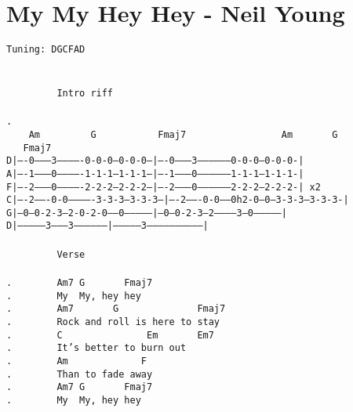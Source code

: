\newpage
\section{My My Hey Hey - Neil Young}
\label{My My Hey Hey - Neil Young}
\texttt{Tuning:\ DGCFAD\\
\\
\\
\ \ \ \ \ \ \ \ \lbrack\ Intro\ riff\rbrack\\
\\
. \ \ \ \ Am\ \ \ \ \ \ \ \ \ G\ \ \ \ \ \ \ \ \ \ \ Fmaj7\ \ \ \ \ \ \ \ \ \ \ \ \ \ \ \ \ Am\ \ \ \ \ \ \ G\ \ \ \ \ \ \ \ \ \ \ \ \ \ Fmaj7\\
D|----0---------3-------------0-0-0--0-0-0--|----0---------3-----------------0-0-0--0-0-0-|\\
A|----1---------0-------------1-1-1--1-1-1--|----1---------0-----------------1-1-1--1-1-1-|\\
F|----2---------0-------------2-2-2--2-2-2--|----2---------0-----------------2-2-2--2-2-2-|\ x2\\
C|----2-------0-0-------------3-3-3--3-3-3--|----2-------0-0-----0h2-0---0---3-3-3--3-3-3-|\\
G|--0---0-2-3---2-0-2-0-----0---------------|--0---0-2-3---2-----------3---0--------------|\\
D|--------------3---------3-----------------|--------------3------------------------------|\\
\\
\ \ \ \ \ \ \ \ \lbrack\ Verse\rbrack\\
\\
. \ \ \ \ \ \ \ Am7\ G\ \ \ \ \ \ \ Fmaj7\\
. \ \ \ \ \ \ \ My\ \ My,\ hey\ hey\\
. \ \ \ \ \ \ \ Am7\ \ \ \ \ \ \ G\ \ \ \ \ \ \ \ \ \ \ \ \ \ Fmaj7\\
. \ \ \ \ \ \ \ Rock\ and\ roll\ is\ here\ to\ stay\\
. \ \ \ \ \ \ \ C\ \ \ \ \ \ \ \ \ \ \ \ \ \ \ Em\ \ \ \ \ \ \ Em7\\
. \ \ \ \ \ \ \ It's\ better\ to\ burn\ out\\
. \ \ \ \ \ \ \ Am\ \ \ \ \ \ \ \ \ \ \ \ \ F\\
. \ \ \ \ \ \ \ Than\ to\ fade\ away\\
. \ \ \ \ \ \ \ Am7\ G\ \ \ \ \ \ \ Fmaj7\\
. \ \ \ \ \ \ \ My\ \ My,\ hey\ hey\\
\\
}
